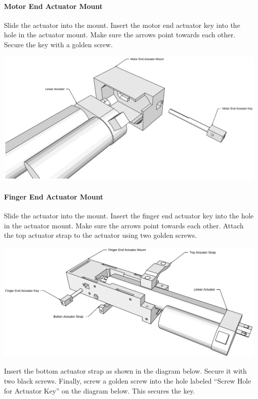 \documentclass[letterpaper,10pt,english]{sphinxmanual}
\begin{document}
\paragraph{Motor End Actuator Mount}
\label{NARFSTR:motor-end-actuator-mount}
Slide the actuator into the mount. Insert the motor end actuator key into the hole in the actuator mount. Make sure the arrows point towards each other. Secure the key with a golden screw.

\includegraphics{MotorEndActuatorMount.pdf}


\paragraph{Finger End Actuator Mount}
\label{NARFSTR:finger-end-actuator-mount}
Slide the actuator into the mount. Insert the finger end actuator key into the hole in the actuator mount. Make sure the arrows point towards each other. Attach the top actuator strap to the actuator using two golden screws.

\includegraphics{FingerEndActuatorMount.pdf}

Insert the bottom actuator strap as shown in the diagram below. Secure it with two black screws. Finally, screw a golden screw into the hole labeled ``Screw Hole for Actuator Key'' on the diagram below. This secures the key.
\end{document}
